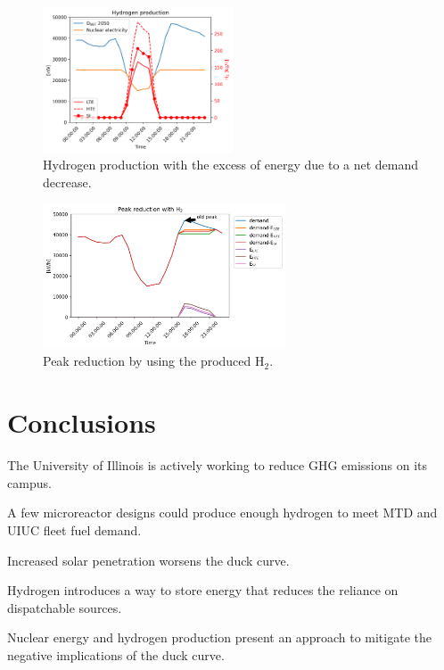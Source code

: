 \documentclass[11pt,letterpaper]{article}
\begin{document}
	\begin{figure}[htbp!]
	    \centering
		\includegraphics[height=4.3cm]{figures/uiuc-hydro2B}
		\hfill
		\caption{Hydrogen production with the excess of energy due to a net demand decrease.}
		\label{fig:uiuc-duck2}
	\end{figure}

	\begin{figure}[htbp!]
	    \centering
		\includegraphics[height=4.3cm]{figures/uiuc-hydro3B}
		\hfill
		\caption{Peak reduction by using the produced H$_2$.}
		\label{fig:uiuc-duck3}
	\end{figure}




\section{Conclusions}

The University of Illinois is actively working to reduce GHG emissions on its campus. 

A few microreactor designs could produce enough hydrogen to meet MTD and UIUC fleet fuel demand.

Increased solar penetration worsens the duck curve.

Hydrogen introduces a way to store energy that reduces the reliance on dispatchable sources.

Nuclear energy and hydrogen production present an approach to mitigate the negative implications of the duck curve.


\pagebreak


\end{document}
